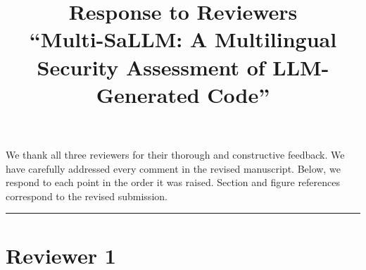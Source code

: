 \documentclass[12pt]{article}
\title{\textbf{Response to Reviewers}\\[0.5em]
\large ``Multi-SaLLM: A Multilingual Security Assessment of LLM-Generated Code''}
\author{}
\date{}
\begin{document}
\maketitle

We thank all three reviewers for their thorough and constructive feedback. We have
carefully addressed every comment in the revised manuscript. Below, we respond to
each point in the order it was raised. Section and figure references correspond to
the revised submission.
\bigskip
\hrule


\section*{Reviewer 1}
\end{document}
